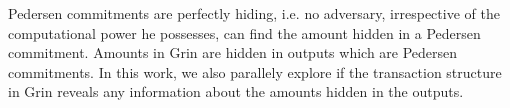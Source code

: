 \begin{Abstract}
Pedersen commitments are perfectly hiding, i.e. no adversary, irrespective of the computational power he possesses, can find the amount hidden in a Pedersen commitment.
Amounts in Grin are hidden in outputs which are Pedersen commitments.
In this work, we also parallely explore if the transaction structure in Grin reveals any information about the amounts hidden in the outputs.

%
%
%
%
%
\end{Abstract}

